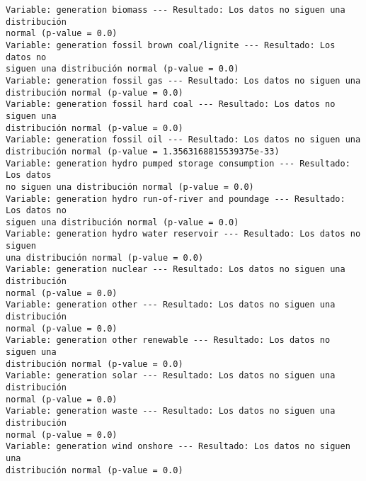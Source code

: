 \documentclass[11pt]{article}
\begin{document}
    \begin{Verbatim}[commandchars=\\\{\}]
Variable: generation biomass --- Resultado: Los datos no siguen una distribución
normal (p-value = 0.0)
Variable: generation fossil brown coal/lignite --- Resultado: Los datos no
siguen una distribución normal (p-value = 0.0)
Variable: generation fossil gas --- Resultado: Los datos no siguen una
distribución normal (p-value = 0.0)
Variable: generation fossil hard coal --- Resultado: Los datos no siguen una
distribución normal (p-value = 0.0)
Variable: generation fossil oil --- Resultado: Los datos no siguen una
distribución normal (p-value = 1.3563168815539375e-33)
Variable: generation hydro pumped storage consumption --- Resultado: Los datos
no siguen una distribución normal (p-value = 0.0)
Variable: generation hydro run-of-river and poundage --- Resultado: Los datos no
siguen una distribución normal (p-value = 0.0)
Variable: generation hydro water reservoir --- Resultado: Los datos no siguen
una distribución normal (p-value = 0.0)
Variable: generation nuclear --- Resultado: Los datos no siguen una distribución
normal (p-value = 0.0)
Variable: generation other --- Resultado: Los datos no siguen una distribución
normal (p-value = 0.0)
Variable: generation other renewable --- Resultado: Los datos no siguen una
distribución normal (p-value = 0.0)
Variable: generation solar --- Resultado: Los datos no siguen una distribución
normal (p-value = 0.0)
Variable: generation waste --- Resultado: Los datos no siguen una distribución
normal (p-value = 0.0)
Variable: generation wind onshore --- Resultado: Los datos no siguen una
distribución normal (p-value = 0.0)
    \end{Verbatim}
\end{document}
